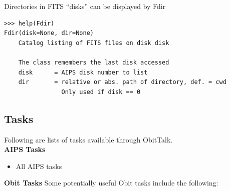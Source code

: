 \documentclass[11pt]{report}
\begin{document}
Directories in FITS ``disks'' can be displayed by Fdir
\begin{verbatim}
>>> help(Fdir)
Fdir(disk=None, dir=None)
    Catalog listing of FITS files on disk disk
    
    The class remembers the last disk accessed
    disk      = AIPS disk number to list
    dir       = relative or abs. path of directory, def. = cwd
                Only used if disk == 0

\end{verbatim}


\subsection{Tasks}

Following are lists of tasks available through ObitTalk.\\
{\bf AIPS Tasks}
\begin{itemize}
\item All AIPS tasks
\end{itemize}
{\bf Obit Tasks}
Some potentially useful Obit tasks include the following:
\end{document}
